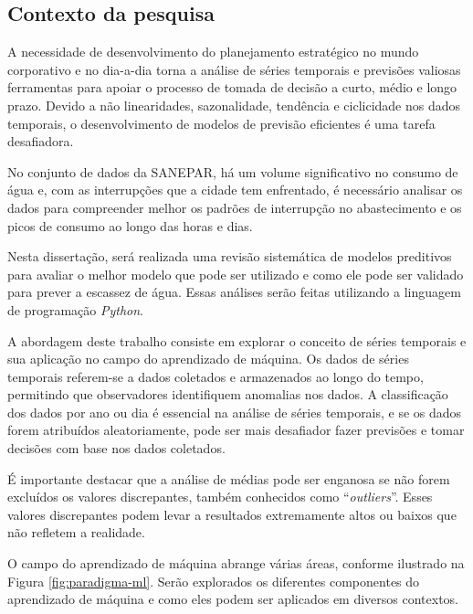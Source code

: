 \subsection{Contexto da pesquisa} \label{subsec:contexto}
 A necessidade de desenvolvimento do planejamento estratégico no mundo corporativo e no dia-a-dia torna a análise de séries temporais e previsões valiosas ferramentas para apoiar o processo de tomada de decisão a curto, médio e longo prazo. Devido a não linearidades, sazonalidade, tendência e ciclicidade nos dados temporais, o desenvolvimento de modelos de previsão eficientes é uma tarefa desafiadora. 

No conjunto de dados da SANEPAR, há um volume significativo no consumo de água e, com as interrupções que a cidade tem enfrentado, é necessário analisar os dados para compreender melhor os padrões de interrupção no abastecimento e os picos de consumo ao longo das horas e dias.

Nesta dissertação, será realizada uma revisão sistemática de modelos preditivos para avaliar o melhor modelo que pode ser utilizado e como ele pode ser validado para prever a escassez de água. Essas análises serão feitas utilizando a linguagem de programação \textit{Python}.

A abordagem deste trabalho consiste em explorar o conceito de séries temporais e sua aplicação no campo do aprendizado de máquina. Os dados de séries temporais referem-se a dados coletados e armazenados ao longo do tempo, permitindo que observadores identifiquem anomalias nos dados. A classificação dos dados por ano ou dia é essencial na análise de séries temporais, e se os dados forem atribuídos aleatoriamente, pode ser mais desafiador fazer previsões e tomar decisões com base nos dados coletados.

É importante destacar que a análise de médias pode ser enganosa se não forem excluídos os valores discrepantes, também conhecidos como ``\textit{outliers}''. Esses valores discrepantes podem levar a resultados extremamente altos ou baixos que não refletem a realidade.

O campo do aprendizado de máquina abrange várias áreas, conforme ilustrado na Figura \ref{fig:paradigma-ml}. Serão explorados os diferentes componentes do aprendizado de máquina e como eles podem ser aplicados em diversos contextos.
 
